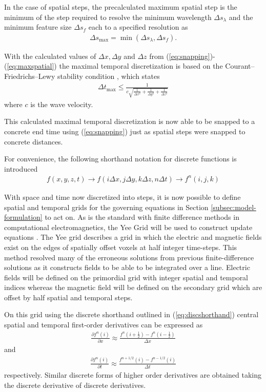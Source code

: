 In the case of spatial steps, the precalculated maximum spatial step is the minimum of the step required to resolve the minimum wavelength $\Delta s_\lambda$ and the minimum feature size $\Delta s_f$ each to a specified resolution as
\begin{align}
	\Delta s_{\max} = \min{(\Delta s_\lambda, \Delta s_f)}.
	\label{eq:maxspatial}
\end{align}

With the calculated values of $\Delta x, \Delta y$ and $\Delta z$ from  (\ref{eq:snapping})-(\ref{eq:maxspatial}) the maximal temporal discretization is based on the Courant–Friedrichs–Lewy stability condition \cite{jin2011theory}, which states
\begin{align}
	\Delta t_{\max} \leq \frac{1}{c\sqrt{\frac{1}{\Delta x^2}+\frac{1}{\Delta y^2}+\frac{1}{\Delta z^2}}}
\end{align}
where $c$ is the wave velocity.

This calculated maximal temporal discretization is now able to be snapped to a concrete end time using  (\ref{eq:snapping}) just as spatial steps were snapped to concrete distances.

For convenience, the following shorthand notation for discrete functions is introduced
\begin{align}
	f(x,y,z,t)\rightarrow f(i\Delta x, j\Delta y, k\Delta z, n\Delta t)\rightarrow f^n(i,j,k)
	\label{eq:discshorthand}
\end{align}

With space and time now discretized into steps, it is now possible to define spatial and temporal grids for the governing equations in Section \ref{subsec:model-formulation} to act on. As is the standard with finite difference methods in computational electromagnetics, the Yee Grid will be used to construct update equations \cite{taftlovefdtd}. The Yee grid describes a grid in which the electric and magnetic fields exist on the edges of spatially offset voxels at half integer time-steps\cite{yee}. This method resolved many of the erroneous solutions from previous finite-difference solutions as it constructs fields to be able to be integrated over a line\cite{rothlecnotes}. Electric fields will be defined on the primordial grid with integer spatial and temporal indices whereas the magnetic field will be defined on the secondary grid which are offset by half spatial and temporal steps.

On this grid using the discrete shorthand outlined in  (\ref{eq:discshorthand}) central spatial and temporal first-order derivatives can be expressed as
\begin{align}
	\frac{\partial f^n(i)}{\partial x} \approx \frac{f^n(i+\frac{1}{2})- f^n(i-\frac{1}{2})}{\Delta x}
	\label{eq:derivspace}
\end{align}
and
\begin{align}
	\frac{\partial f^n(i)}{\partial t} \approx \frac{f^{n+1/2}(i)- f^{n-1/2}(i)}{\Delta t}
	\label{eq:derivtime}
\end{align}
respectively. Similar discrete forms of higher order derivatives are obtained taking the discrete derivative of discrete derivatives.


